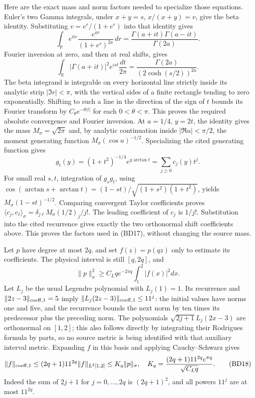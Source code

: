 \documentclass[11pt]{article}
\begin{document}
Here are the exact mass and norm factors needed to specialize those equations. Euler's two Gamma integrals, under \(x+y=s\), \(x/(x+y)=v\), give the beta identity. Substituting \(v=e^r/(1+e^r)\) into that identity gives \[
\int_{\mathbb R}e^{itr}\frac{e^{ar}}{(1+e^r)^{2a}}\,dr
=\frac{\Gamma(a+it)\Gamma(a-it)}{\Gamma(2a)}.
\] Fourier inversion at zero, and then at real shifts, gives \[
\int_{\mathbb R}|\Gamma(a+it)|^2e^{ist}\frac{dt}{2\pi}
=\frac{\Gamma(2a)}{(2\cosh(s/2))^{2a}}.
\] The beta integrand is integrable on every horizontal line strictly inside its analytic strip \(|\Im r|<\pi\), with the vertical sides of a finite rectangle tending to zero exponentially. Shifting to such a line in the direction of the sign of \(t\) bounds its Fourier transform by \(C_\theta e^{-\theta|t|}\) for each \(0<\theta<\pi\). This proves the required absolute convergence and Fourier inversion. At \(a=1/4\), \(y=2t\), the identity gives the mass \(M_\sigma=\sqrt{2\pi}\) and, by analytic continuation inside \(|\Re u|<\pi/2\), the moment generating function \(M_\sigma(\cos u)^{-1/2}\). Specializing the cited generating function gives \[
g_t(y)=(1+t^2)^{-1/4}e^{y\arctan t}=\sum_{j\ge0}c_j(y)t^j.
\] For small real \(s,t\), integration of \(g_sg_t\), using \(\cos(\arctan s+\arctan t)=(1-st)/\sqrt{(1+s^2)(1+t^2)}\), yields \(M_\sigma(1-st)^{-1/2}\). Comparing convergent Taylor coefficients proves \(\langle c_j,c_\ell\rangle_\sigma=\delta_{j\ell}M_\sigma(1/2)_j/j!\). The leading coefficient of \(c_j\) is \(1/j!\). Substitution into the cited recurrence gives exactly the two orthonormal shift coefficients above. This proves the factors used in (BD17), without changing the source mass.

Let \(p\) have degree at most \(2q\), and set \(f(z)=p(qz)\) only to estimate its coefficients. The physical interval is still \([q,2q]\), and \[
\|p\|_\sigma^2\ge C_Lqe^{-2\pi q}\int_1^2|f(x)|^2dx.
\] Let \(L_j\) be the usual Legendre polynomial with \(L_j(1)=1\). Its recurrence and \(\|2z-3\|_{\rm coeff,1}=5\) imply \(\|L_j(2z-3)\|_{\rm coeff,1}\le11^j\): the initial values have norms one and five, and the recurrence bounds the next norm by ten times its predecessor plus the preceding norm. The polynomials \(\sqrt{2j+1}L_j(2x-3)\) are orthonormal on \([1,2]\); this also follows directly by integrating their Rodrigues formula by parts, so no source metric is being identified with that auxiliary interval metric. Expanding \(f\) in this basis and applying Cauchy--Schwarz gives \[
\|f\|_{\rm coeff,1}
\le(2q+1)11^{2q}\|f\|_{L^2[1,2]}
\le K_q\|p\|_\sigma,
\quad K_q=\frac{(2q+1)11^{2q}e^{\pi q}}{\sqrt{C_Lq}}. \tag{BD18}
\] Indeed the sum of \(2j+1\) for \(j=0,\ldots,2q\) is \((2q+1)^2\), and all powers \(11^j\) are at most \(11^{2q}\).
\end{document}
